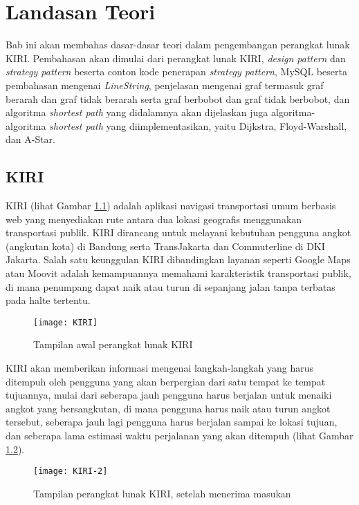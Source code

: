 \chapter{Landasan Teori}
\label{chap:teori}
Bab ini akan membahas dasar-dasar teori dalam pengembangan perangkat lunak KIRI. Pembahasan akan dimulai dari perangkat lunak KIRI, \textit{design pattern} dan \textit{strategy pattern} beserta conton kode penerapan \textit{strategy pattern}, MySQL beserta pembahasan mengenai \textit{LineString}, penjelasan mengenai graf termasuk graf berarah dan graf tidak berarah serta graf berbobot dan graf tidak berbobot, dan algoritma \textit{shortest path} yang didalamnya akan dijelaskan juga algoritma-algoritma \textit{shortest path} yang diimplementasikan, yaitu Dijkstra, Floyd-Warshall, dan A-Star.
\section{KIRI ~\cite{nugroho_natali:17:KIRI}}
\label{sec:kiri}
KIRI (lihat Gambar \ref{fig:tampilanawalkiri}) adalah aplikasi navigasi transportasi umum berbasis web yang menyediakan rute antara dua lokasi geografis menggunakan transportasi publik. KIRI dirancang untuk melayani kebutuhan pengguna angkot (angkutan kota) di Bandung serta TransJakarta dan Commuterline di DKI Jakarta. Salah satu keunggulan KIRI dibandingkan layanan seperti Google Maps atau Moovit adalah kemampuannya memahami karakteristik  transportasi publik, di mana penumpang dapat naik atau turun di sepanjang jalan tanpa terbatas pada halte tertentu.
\begin{figure}[H] 
	\centering  
	\texttt{[image: KIRI]}  
	\caption{Tampilan awal perangkat lunak KIRI}
	\label{fig:tampilanawalkiri} 
\end{figure}
\newpage
KIRI akan memberikan informasi mengenai langkah-langkah yang harus ditempuh oleh pengguna yang akan berpergian dari satu tempat ke tempat tujuannya, mulai dari seberapa jauh pengguna harus berjalan untuk menaiki angkot yang bersangkutan, di mana pengguna harus naik atau turun angkot tersebut, seberapa jauh lagi pengguna harus berjalan sampai ke lokasi tujuan, dan seberapa lama estimasi waktu perjalanan yang akan ditempuh (lihat Gambar \ref{fig:tampilankiri}).
\begin{figure}[H] 
	\centering  
	\texttt{[image: KIRI-2]}  
	\caption{Tampilan perangkat lunak KIRI, setelah menerima masukan}
	\label{fig:tampilankiri} 
\end{figure}

